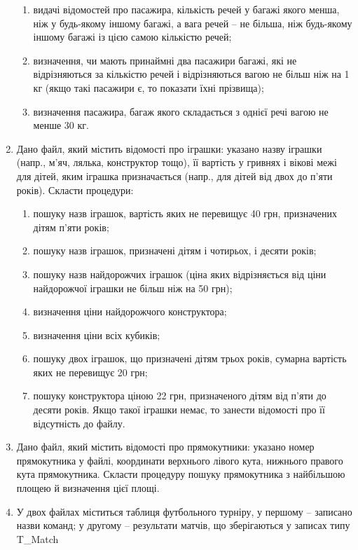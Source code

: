 \documentclass[]{article}
\makeatletter
\newcommand{\xslalph}[1]{\expandafter\@xslalph\csname c@#1\endcsname}
\newcommand{\@xslalph}[1]{%
    \ifcase#1\or а\or б\or в\or г\or д\or e\or є\or ж\or з\or i%
    \or й\or к\or л\or м\or н\or о\or п\or р\or с\or т%
    \or у\or ф\or х\or ц\or ч\or ш\or ю\or я\or аа\or бб\or вв %
    \else\@ctrerr\fi%
}
\makeatother
\begin{document}
\begin{enumerate}
\begin{enumerate}[label=\xslalph*)]
\item видачі відомостей про пасажира, кількість речей у багажі якого менша,
ніж у будь-якому іншому багажі, а вага речей -- не більша, ніж
будь-якому іншому багажі із цією самою кількістю речей;

\item визначення, чи мають принаймні два пасажири багажі, які не
відрізняються за кількістю речей і відрізняються вагою не більш ніж на 1
кг (якщо такі пасажири є, то показати їхні прізвища);

\item визначення пасажира, багаж якого складається з однієї речі вагою не
менше 30 кг.
\end{enumerate}
\item
Дано файл, який містить відомості про іграшки: указано назву іграшки
(напр., м'яч, лялька, конструктор тощо), її вартість у гривнях і вікові
межі для дітей, яким іграшка призначається (напр., для дітей від двох до
п'яти років). Скласти процедури:
\begin{enumerate}[label=\xslalph*)]
\item
пошуку назв іграшок, вартість яких не перевищує 40 грн, призначених
дітям п'яти років;
\item пошуку назв іграшок, призначені дітям і чотирьох, і десяти років;
\item пошуку назв найдорожчих іграшок (ціна яких відрізняється від ціни
найдорожчої іграшки не більш ніж на 50 грн);
\item визначення ціни найдорожчого конструктора;
\item визначення ціни всіх кубиків;
\item пошуку двох іграшок, що призначені дітям трьох років, сумарна
вартість яких не перевищує 20 грн;
\item пошуку конструктора ціною 22 грн, призначеного дітям від п'яти до
десяти років. Якщо такої іграшки немає, то занести відомості про її
відсутність до файлу.
\end{enumerate}

\item
Дано файл, який містить відомості про прямокутники: указано номер
прямокутника у файлі, координати верхнього лівого кута, нижнього правого
кута прямокутника. Скласти процедуру пошуку прямокутника з найбільшою
площею й визначення цієї площі.

\item 
У двох файлах міститься
таблиця футбольного турніру, у першому -- записано назви команд; у
другому -- результати матчів, що зберігаються у записах типу T\_Match


\end{enumerate}
\end{document}

